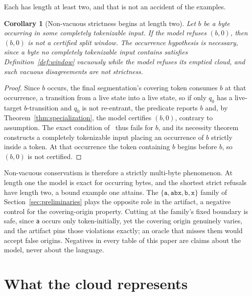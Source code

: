 \documentclass[11pt,a4paper]{article}
\theoremstyle{definition}
\theoremstyle{plain}
\newtheorem{corollary}{Corollary}
\newcommand{\code}[1]{\texttt{#1}}
\begin{document}
Each has length at least two, and that is not an accident of the examples.

\begin{corollary}[Non-vacuous strictness begins at length two]
\label{cor:strictness}
Let $b$ be a byte occurring in some completely tokenizable input. If the model refuses $(b, 0)$, then $(b, 0)$ is not a
certified split window. The occurrence hypothesis is necessary, since a byte no completely tokenizable input contains
satisfies Definition~\ref{def:window} vacuously while the model refuses its emptied cloud, and such vacuous
disagreements are not strictness.
\end{corollary}

\begin{proof}
Since $b$ occurs, the final segmentation's covering token consumes $b$ at that occurrence, a transition from a live
state into a live state, so if only $q_0$ has a live-target $b$-transition and $q_0$ is not re-entrant, the predicate
reports $b$ and, by Theorem~\ref{thm:specialization}, the model certifies $(b, 0)$, contrary to assumption. The exact
condition of~\cite{nidhogg2026splitpoints} thus fails for $b$, and its necessity theorem constructs a completely
tokenizable input placing an occurrence of $b$ strictly inside a token. At that occurrence the token containing $b$
begins before $b$, so $(b, 0)$ is not certified.
\end{proof}

Non-vacuous conservatism is therefore a strictly multi-byte phenomenon. At length one the model is exact for occurring
bytes, and the shortest strict refusals have length two, a bound example one attains. The
$\{\code{a}, \code{abx}, \code{b}, \code{x}\}$ family of Section~\ref{sec:preliminaries} plays the opposite role in the
artifact, a negative control for the covering-origin property. Cutting at the family's fixed boundary is safe, since
\code{a} occurs only token-initially, yet the covering origin genuinely varies, and the artifact pins those violations
exactly; an oracle that misses them would accept false origins. Negatives in every table of this paper are claims about
the model, never about the language.

\section{What the cloud represents}
\label{sec:factorization}
\end{document}
